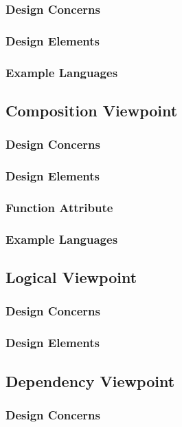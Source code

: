 \documentclass[letterpaper,10pt,titlepage,draftclsnofoot,onecolumn,onesided] {IEEEtran}
\begin{document}
\subsubsection{Design Concerns}
\subsubsection{Design Elements}
\subsubsection{Example Languages}

\subsection{Composition Viewpoint}
\subsubsection{Design Concerns}
\subsubsection{Design Elements}
\subsubsection{Function Attribute}
\subsubsection{Example Languages}

\subsection{Logical Viewpoint}
\subsubsection{Design Concerns}
\subsubsection{Design Elements}

\subsection{Dependency Viewpoint}
\subsubsection{Design Concerns}
\end{document}
